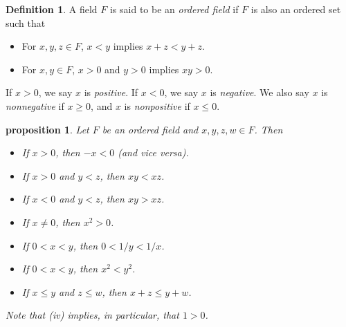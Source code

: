\documentclass{article}
\newtheorem{proposition}{Proposition}[section]
\newtheorem{proposition}{proposition}[section]
\theoremstyle{definition}
\newtheorem{definition}{Definition}[section]
\theoremstyle{remark}
\begin{document}
\begin{definition}\label{def:ordered_field}
A field \( F \) is said to be an \textit{ordered field} if \( F \) is also an ordered set such that
\begin{itemize}
\item[(i)] For \( x, y, z \in F \), \( x < y \) implies \( x + z < y + z \).
\item[(ii)] For \( x, y \in F \), \( x > 0 \) and \( y > 0 \) implies \( xy > 0 \).
\end{itemize}
If \( x > 0 \), we say \( x \) is \textit{positive}. If \( x < 0 \), we say \( x \) is \textit{negative}. We also say \( x \) is \textit{nonnegative} if \( x \geq 0 \), and \( x \) is \textit{nonpositive} if \( x \leq 0 \).
\end{definition}
















\begin{proposition} \label{prop:ordered_field_properties}
Let \( F \) be an ordered field and \( x, y, z, w \in F \). Then
\begin{itemize}
\item[(i)] If \( x > 0 \), then \( -x < 0 \) (and vice versa).
\item[(ii)] If \( x > 0 \) and \( y < z \), then \( xy < xz \).
\item[(iii)] If \( x < 0 \) and \( y < z \), then \( xy > xz \).
\item[(iv)] If \( x \neq 0 \), then \( x^2 > 0 \).
\item[(v)] If \( 0 < x < y \), then \( 0 < 1/y < 1/x \).
\item[(vi)] If \( 0 < x < y \), then \( x^2 < y^2 \).
\item[(vii)] If \( x \leq y \) and \( z \leq w \), then \( x + z \leq y + w \).
\end{itemize}
Note that (iv) implies, in particular, that \( 1 > 0 \).\\
\end{proposition}
\end{document}
